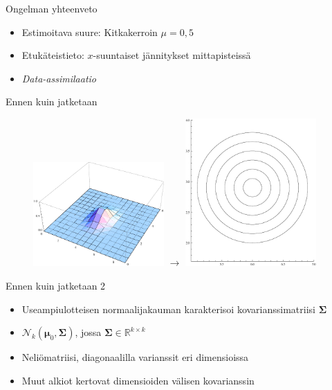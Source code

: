 \documentclass{beamer}
\begin{document}
\begin{frame}{Ongelman yhteenveto}

\begin{itemize}
\item Estimoitava suure: Kitkakerroin $\mu=0{,}5$
\item Etukäteistieto: $x$-suuntaiset jännitykset mittapisteissä
\item \emph{Data-assimilaatio}
\end{itemize}

\end{frame}

\begin{frame}{Ennen kuin jatketaan}

\begin{figure}
\includegraphics[width=5cm]{2dnormal.pdf}
$\rightarrow$
\includegraphics[width=5cm]{2dcontour.pdf}
\end{figure}

\end{frame}

\begin{frame}{Ennen kuin jatketaan 2}

\begin{itemize}
\item Useampiulotteisen normaalijakauman karakterisoi kovarianssimatriisi $\boldsymbol{\Sigma}$
\item $\mathcal{N}_k(\boldsymbol{\mu}_0,\boldsymbol{\Sigma})$, jossa $\boldsymbol{\Sigma} \in \mathbb{R}^{k \times k}$
\item Neliömatriisi, diagonaalilla varianssit eri dimensioissa
\item Muut alkiot kertovat dimensioiden välisen kovarianssin
\end{itemize}

\end{frame}
\end{document}
